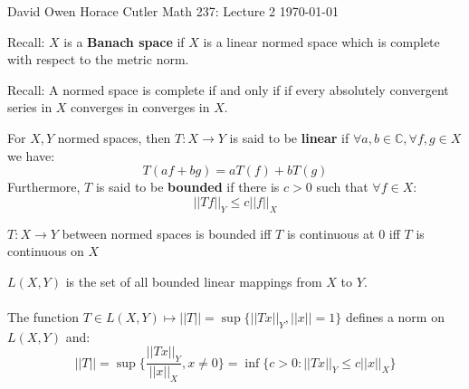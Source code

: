 \documentclass[12pt]{article}
\newenvironment{theorem}[2][Theorem]{\begin{trivlist}
\item[\hskip \labelsep {\bfseries #1}\hskip \labelsep {\bfseries #2.}]}{\end{trivlist}}
\newenvironment{definition}[2][Definition]{\begin{trivlist}
\item[\hskip \labelsep {\bfseries #1}\hskip \labelsep {\bfseries #2.}]}{\end{trivlist}}
\begin{document}
\noindent David Owen Horace Cutler \hfill {\Large Math 237: Lecture 2} \hfill \today

\begin{definition}{(Banach Space)}
    Recall: $X$ is a \textbf{Banach space} if $X$ is a linear normed space which is complete with respect to the metric norm. 
\end{definition}

\begin{theorem}{(Completeness Characterization)}
    Recall: A normed space is complete if and only if if every absolutely convergent series in $X$ converges in converges in $X$.
\end{theorem}

\begin{definition}{(Linearity and Boundedness)}
    For $X, Y$ normed spaces, then $T : X \rightarrow Y$ is said to be \textbf{linear} if $\forall a, b \in \mathbb{C}, \forall f, g \in X$ we have:
    $$T(af + bg) = aT(f) + bT(g)$$
    Furthermore, $T$ is said to be \textbf{bounded} if there is $c > 0$ such that $\forall f \in X$:
    $$||Tf||_Y \leq c||f||_X$$
\end{definition}

\begin{theorem}{(Continuity)}
    $T : X \rightarrow Y$ between normed spaces is bounded iff $T$ is continuous at $0$ iff $T$ is continuous on $X$
\end{theorem}

\begin{definition}{(Norm of a Transformation)}
    $L(X,Y)$ is the set of all bounded linear mappings from $X$ to $Y$. \\ \\
    The function $T \in L(X,Y) \mapsto ||T|| = \sup\{||Tx||_Y, ||x|| = 1\}$ defines a norm on $L(X,Y)$ and:
    $$||T|| = \sup \Big \{\frac{||Tx||_Y}{||x||_X}, x \neq 0\} = \inf\{c > 0 : ||Tx||_Y \leq c||x||_X\}$$ 
\end{definition}
\end{document}

